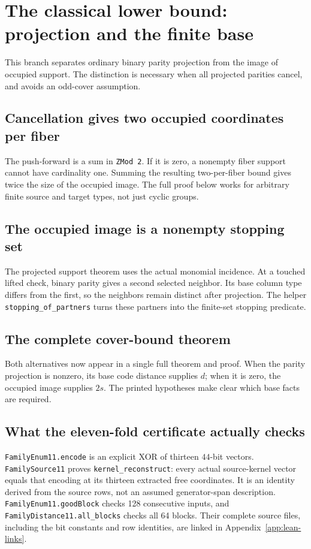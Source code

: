 \clearpage
\section{The classical lower bound: projection and the finite base}\label{app:lean-classical}
This branch separates ordinary binary parity projection from the image of
occupied support. The distinction is necessary when all projected parities
cancel, and avoids an odd-cover assumption.

\subsection{Cancellation gives two occupied coordinates per fiber}
The push-forward is a sum in \texttt{ZMod 2}. If it is zero, a nonempty
fiber support cannot have cardinality one. Summing the resulting two-per-fiber
bound gives twice the size of the occupied image. The full proof below
works for arbitrary finite source and target types, not just cyclic groups.

\subsection{The occupied image is a nonempty stopping set}
The projected support theorem uses the actual monomial incidence. At a
touched lifted check, binary parity gives a second selected neighbor.
Its base column type differs from the first, so the neighbors remain
distinct after projection. The helper \texttt{stopping\_of\_partners}
turns these partners into the finite-set stopping predicate.

\subsection{The complete cover-bound theorem}
Both alternatives now appear in a single full theorem and proof. When
the parity projection is nonzero, its base code distance supplies $d$;
when it is zero, the occupied image supplies $2s$. The printed hypotheses
make clear which base facts are required.

\subsection{What the eleven-fold certificate actually checks}
\nolinkurl{FamilyEnum11.encode} is an explicit XOR of thirteen $44$-bit
vectors. \nolinkurl{FamilySource11} proves
\texttt{kernel\_reconstruct}: every actual source-kernel vector equals
that encoding at its thirteen extracted free coordinates. It is an
identity derived from the source rows, not an assumed generator-span
description. \nolinkurl{FamilyEnum11.goodBlock} checks 128 consecutive
inputs, and \nolinkurl{FamilyDistance11.all_blocks} checks all 64 blocks.
Their complete source files, including the bit constants and row identities,
are linked in Appendix~\ref{app:lean-links}.

